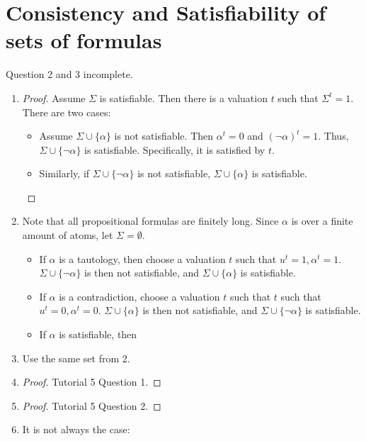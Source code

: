 \documentclass[12pt]{article}
\begin{document}
    \section{Consistency and Satisfiability of sets of formulas}
    Question 2 and 3 incomplete.
    \begin{enumerate}
        \item \begin{proof}
            Assume $\Sigma$ is satisfiable. Then there is a valuation $t$ such that $\Sigma^t=1$. There are two cases:
            \begin{itemize}
                \item Assume $\Sigma\cup\{\alpha\}$ is not satisfiable. Then $\alpha^t=0$ and $(\neg\alpha)^t=1$. Thus, $\Sigma\cup\{\neg\alpha\}$ is satisfiable. Specifically, it is satisfied by $t$.
                \item Similarly, if $\Sigma\cup\{\neg\alpha\}$ is not satisfiable, $\Sigma\cup\{\alpha\}$ is satisfiable.
            \end{itemize}
        \end{proof}
        \item Note that all propositional formulas are finitely long. Since $\alpha$ is over a finite amount of  atoms, let $\Sigma=\emptyset$.
        \begin{itemize}
            \item If $\alpha$ is a tautology, then choose a valuation $t$ such that $u^t=1, \alpha^t=1$. $\Sigma\cup\{\neg\alpha\}$ is then not satisfiable, and $\Sigma\cup\{\alpha\}$ is satisfiable.
            \item If $\alpha$ is a contradiction, choose a valuation $t$ such that $t$ such that $u^t=0, \alpha^t=0$. $\Sigma\cup\{\alpha\}$ is then not satisfiable, and $\Sigma\cup\{\neg\alpha\}$ is satisfiable.
            \item If $\alpha$ is satisfiable, then 
        \end{itemize}
        \item Use the same set from 2.
        \item \begin{proof}
            Tutorial 5 Question 1.
        \end{proof}
        \item \begin{proof}
            Tutorial 5 Question 2.
        \end{proof}
        \item  It is not always the case:\\\\

\end{enumerate}
\end{document}
